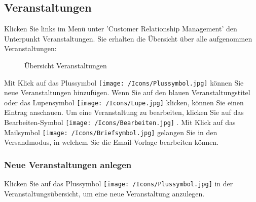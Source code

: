 \vspace{\baselineskip}

\subsection{Veranstaltungen}

Klicken Sie links im Menü unter 'Customer Relationship Management' den Unterpunkt Veranstaltungen. Sie erhalten die Übersicht über alle aufgenommen Veranstaltungen:

\begin{figure}[H]
\caption{Übersicht Veranstaltungen}
\end{figure}

Mit Klick auf das Plussymbol \texttt{[image: /Icons/Plussymbol.jpg]}  können Sie neue Veranstaltungen hinzufügen. Wenn Sie auf den blauen Veranstaltungstitel oder das Lupensymbol \texttt{[image: /Icons/Lupe.jpg]}  klicken, können Sie einen Eintrag anschauen. Um eine Veranstaltung zu bearbeiten, klicken Sie auf das Bearbeiten-Symbol \texttt{[image: /Icons/Bearbeiten.jpg]} . Mit Klick auf das Mailsymbol \texttt{[image: /Icons/Briefsymbol.jpg]}  gelangen Sie in den Versandmodus, in welchem Sie die Email-Vorlage bearbeiten können.

\subsubsection{Neue Veranstaltungen anlegen}

Klicken Sie auf das Plussymbol \texttt{[image: /Icons/Plussymbol.jpg]} in der Veranstaltungsübersicht, um eine neue Veranstaltung anzulegen.

